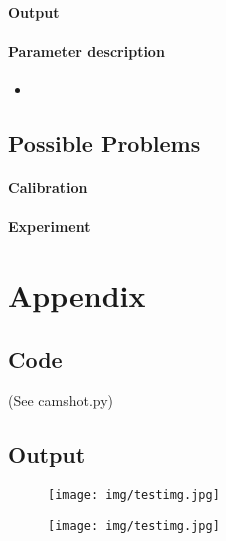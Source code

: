 \documentclass{scrartcl}
\begin{document}
\paragraph{Output}

\paragraph{Parameter description}
\begin{itemize}
\item
\end{itemize}


\subsection{Possible Problems}
\paragraph{Calibration}

\paragraph{Experiment}



\section{Appendix}


\subsection{Code}
(See camshot.py)


\subsection{Output}

\begin{figure}[H]
\centering
\begin{minipage}{.5\textwidth}
  \centering
  \texttt{[image: img/testimg.jpg]}
\end{minipage}%
\begin{minipage}{.5\textwidth}
  \centering
  \texttt{[image: img/testimg.jpg]}
\end{minipage}
\end{figure}
\end{document}
